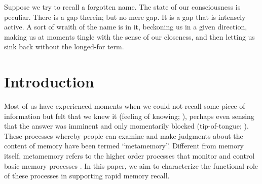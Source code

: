 \begin{savequote}[75mm]
Suppose we try to recall a forgotten name. The state of our consciousness is peculiar. There is a gap therein; but no mere gap. It is a gap that is intensely active. A sort of wraith of the name is in it, beckoning us in a given direction, making us at moments tingle with the sense of our closeness, and then letting us sink back without the longed-for term.
\end{savequote}





\label{sec:memory}


\newcommand{\citepnelson}{(Nelson \& Narens, 1990)}
\newcommand{\citetnelson}{Nelson \& Narens (1990)}
\newcommand{\citealpnelson}{Nelson \& Narens, 1990}

\section{Introduction}
Most of us have experienced moments when we could not recall some piece of information but felt that we knew it (feeling of knowing; \citealp{hart1965memory}), perhaps even sensing that the answer was imminent and only momentarily blocked (tip-of-tongue; \citealp{brown1966tip}). These processes whereby people can examine and make judgments about the content of memory have been termed ``metamemory''. Different from memory itself, metamemory refers to the higher order processes that monitor and control basic memory processes \citep{nelson1990metamemory}. In this paper, we aim to characterize the functional role of these processes in supporting rapid memory recall.

